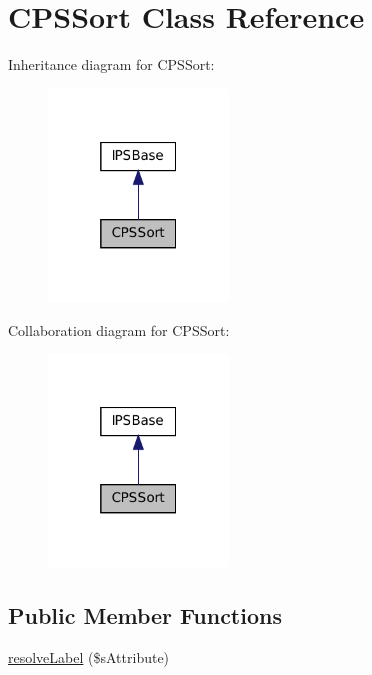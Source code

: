 \hypertarget{classCPSSort}{
\section{CPSSort Class Reference}
\label{classCPSSort}
}


Inheritance diagram for CPSSort:\nopagebreak
\begin{figure}[H]
\begin{center}
\leavevmode
\includegraphics[width=136pt]{classCPSSort__inherit__graph}
\end{center}
\end{figure}


Collaboration diagram for CPSSort:\nopagebreak
\begin{figure}[H]
\begin{center}
\leavevmode
\includegraphics[width=136pt]{classCPSSort__coll__graph}
\end{center}
\end{figure}
\subsection*{Public Member Functions}
\begin{DoxyCompactItemize}
\item 
\hyperlink{classCPSSort_a7e304951e7585dcf2bef6490a18b177b}{resolveLabel} (\$sAttribute)
\end{DoxyCompactItemize}


